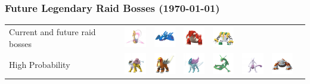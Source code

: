 \documentclass[8pt,aspectratio=169,compress]{beamer}
\begin{document}
\begin{frame}
\frametitle{Future Legendary Raid Bosses (\today)}

\begin{block}{}
\begin{tiny}

\begin{tabular}{lccccccc}
Current and future raid bosses
& \includegraphics[width=1cm]{../../images/pokemon/cresselia.png}
& \includegraphics[width=1cm]{../../images/pokemon/kyogre.png}
& \includegraphics[width=1cm]{../../images/pokemon/groudon.png}
& \includegraphics[width=1cm]{../../images/pokemon/regigigas.png} \\
High Probability 
& \includegraphics[width=1cm]{../../images/pokemon/raikou.png}
& \includegraphics[width=1cm]{../../images/pokemon/entei.png}
& \includegraphics[width=1cm]{../../images/pokemon/suicune.png}
& \includegraphics[width=1cm]{../../images/pokemon/rayquaza.png}
& \includegraphics[width=1cm]{../../images/pokemon/mewtwo.png}
& \includegraphics[width=1cm]{../../images/pokemon/heatran.png}\\

\end{tabular}
\end{tiny}
\end{block}
\end{frame}
\end{document}
